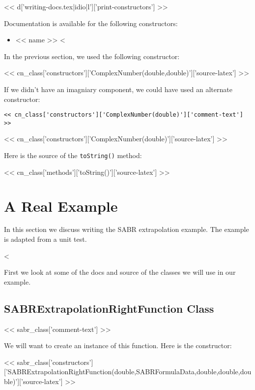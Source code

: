 << d['writing-docs.tex|idio|l']['print-constructors'] >>

Documentation is available for the following constructors:

\begin{itemize}
<%
\item{<< name >>}
<%
\end{itemize}

In the previous section, we used the following constructor:

<< cn_class['constructors']['ComplexNumber(double,double)']['source-latex'] >>

If we didn't have an imagniary component, we could have used an alternate constructor:

\begin{Verbatim}
<< cn_class['constructors']['ComplexNumber(double)']['comment-text'] >>
\end{Verbatim}
<< cn_class['constructors']['ComplexNumber(double)']['source-latex'] >>

Here is the source of the \verb|toString()| method:

<< cn_class['methods']['toString()']['source-latex'] >>

\section{A Real Example}

In this section we discuss writing the SABR extrapolation example. The example
is adapted from a unit test.

<%

First we look at some of the docs and source of the classes we will use in our
example.

\subsection{SABRExtrapolationRightFunction Class}

<< sabr_class['comment-text'] >>

We will want to create an instance of this function. Here is the constructor:

<< sabr_class['constructors']['SABRExtrapolationRightFunction(double,SABRFormulaData,double,double,double)']['source-latex'] >>

